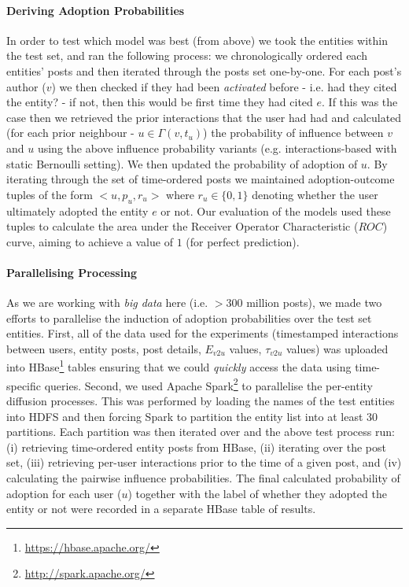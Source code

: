 \documentclass[10pt,journal,compsoc]{IEEEtran}
\begin{document}
\paragraph{Deriving Adoption Probabilities}
In order to test which model was best (from above) we took the entities within the test set, and ran the following process: we chronologically ordered each entities' posts and then iterated through the posts set one-by-one.
For each post's author ($v$) we then checked if they had been \emph{activated} before - i.e. had they cited the entity? - if not, then this would be first time they had cited $e$.
If this was the case then we retrieved the prior interactions that the user had had and calculated (for each prior neighbour - $u \in \Gamma(v, t_u)$) the probability of influence between $v$ and $u$ using the above influence probability variants (e.g. interactions-based with static Bernoulli setting).
We then updated the probability of adoption of $u$.
By iterating through the set of time-ordered posts we maintained adoption-outcome tuples of the form $<u, p_u, r_u>$ where $r_u \in \{0,1\}$ denoting whether the user ultimately adopted the entity $e$ or not.
Our evaluation of the models used these tuples to calculate the area under the Receiver Operator Characteristic ($ROC$) curve, aiming to achieve a value of $1$ (for perfect prediction).

\paragraph{Parallelising Processing}
As we are working with \emph{big data} here (i.e. $>300$ million posts), we made two efforts to parallelise the induction of adoption probabilities over the test set entities.
First, all of the data used for the experiments (timestamped interactions between users, entity posts, post details, $E_{v2u}$ values, $\tau_{v2u}$ values) was uploaded into HBase\footnote{\url{https://hbase.apache.org/}} tables ensuring that we could \emph{quickly} access the data using time-specific queries.
Second, we used Apache Spark\footnote{\url{http://spark.apache.org/}} to parallelise the per-entity diffusion processes.
This was performed by loading the names of the test entities into HDFS and then forcing Spark to partition the entity list into at least 30 partitions.
Each partition was then iterated over and the above test process run: (i) retrieving time-ordered entity posts from HBase, (ii) iterating over the post set, (iii) retrieving per-user interactions prior to the time of a given post, and (iv) calculating the pairwise influence probabilities.
The final calculated probability of adoption for each user ($u$) together with the label of whether they adopted the entity or not were recorded in a separate HBase table of results.
\end{document}
